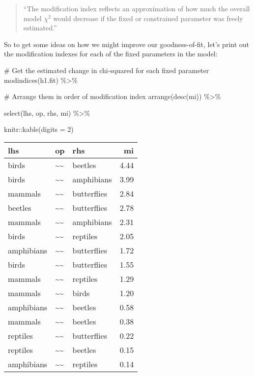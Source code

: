 \documentclass[
  letterpaper,
  DIV=11,
  numbers=noendperiod]{scrreprt}
\newenvironment{Shaded}{\begin{snugshade}}{\end{snugshade}}
\newcommand{\AttributeTok}[1]{\textcolor[rgb]{0.40,0.45,0.13}{#1}}
\newcommand{\CommentTok}[1]{\textcolor[rgb]{0.37,0.37,0.37}{#1}}
\newcommand{\DecValTok}[1]{\textcolor[rgb]{0.68,0.00,0.00}{#1}}
\newcommand{\FunctionTok}[1]{\textcolor[rgb]{0.28,0.35,0.67}{#1}}
\newcommand{\NormalTok}[1]{\textcolor[rgb]{0.00,0.23,0.31}{#1}}
\newcommand{\SpecialCharTok}[1]{\textcolor[rgb]{0.37,0.37,0.37}{#1}}
\begin{document}
\begin{quote}
``The modification index reflects an approximation of how much the
overall model \(χ^2\) would decrease if the fixed or constrained
parameter was freely estimated.''
\end{quote}

So to get some ideas on how we might improve our goodness-of-fit, let's
print out the modification indexes for each of the fixed parameters in
the model:

\begin{Shaded}
\begin{Highlighting}[]
\CommentTok{\# Get the estimated change in chi{-}squared for each fixed parameter}
\FunctionTok{modindices}\NormalTok{(h1.fit) }\SpecialCharTok{\%\textgreater{}\%} 
  
  \CommentTok{\# Arrange them in order of modification index}
  \FunctionTok{arrange}\NormalTok{(}\FunctionTok{desc}\NormalTok{(mi)) }\SpecialCharTok{\%\textgreater{}\%} 
  
  \FunctionTok{select}\NormalTok{(lhs, op, rhs, mi) }\SpecialCharTok{\%\textgreater{}\%} 
  
\NormalTok{  knitr}\SpecialCharTok{::}\FunctionTok{kable}\NormalTok{(}\AttributeTok{digits =} \DecValTok{2}\NormalTok{)}
\end{Highlighting}
\end{Shaded}

\begin{longtable}[]{@{}lllr@{}}
\toprule()
lhs & op & rhs & mi \\
\midrule()
\endhead
birds & \textasciitilde\textasciitilde{} & beetles & 4.44 \\
birds & \textasciitilde\textasciitilde{} & amphibians & 3.99 \\
mammals & \textasciitilde\textasciitilde{} & butterflies & 2.84 \\
beetles & \textasciitilde\textasciitilde{} & butterflies & 2.78 \\
mammals & \textasciitilde\textasciitilde{} & amphibians & 2.31 \\
birds & \textasciitilde\textasciitilde{} & reptiles & 2.05 \\
amphibians & \textasciitilde\textasciitilde{} & butterflies & 1.72 \\
birds & \textasciitilde\textasciitilde{} & butterflies & 1.55 \\
mammals & \textasciitilde\textasciitilde{} & reptiles & 1.29 \\
mammals & \textasciitilde\textasciitilde{} & birds & 1.20 \\
amphibians & \textasciitilde\textasciitilde{} & beetles & 0.58 \\
mammals & \textasciitilde\textasciitilde{} & beetles & 0.38 \\
reptiles & \textasciitilde\textasciitilde{} & butterflies & 0.22 \\
reptiles & \textasciitilde\textasciitilde{} & beetles & 0.15 \\
amphibians & \textasciitilde\textasciitilde{} & reptiles & 0.14 \\
\bottomrule()
\end{longtable}
\end{document}
